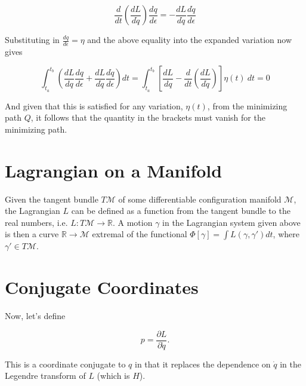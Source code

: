 \documentclass{article}\usepackage[]{graphicx}\usepackage[]{color}
\begin{document}
$$
\frac{d}{dt}\left(\frac{dL}{d\dot{q}}\right)\frac{dq}{d\epsilon}=-\frac{dL}{d\dot{q}}\frac{d\dot{q}}{d\epsilon}
$$

Substituting in $\frac{dq}{d\epsilon}=\eta$ and the above equality into the expanded variation now gives

\begin{equation}
\int^{t_b}_{t_a}\left( \frac{dL}{dq}\frac{dq}{d\epsilon}+\frac{dL}{d\dot{q}}\frac{d\dot{q}}{d\epsilon}\right) dt=\int^{t_b}_{t_a}\left[ \frac{dL}{dq} -\frac{d}{dt}\left( \frac{dL}{d\dot{q}}\right)  \right] \eta(t) \ dt=0
\end{equation}

And given that this is satisfied for any variation, $\eta(t)$, from the minimizing path $Q$, it follows that the quantity in the brackets must vanish for the minimizing path.




\section{Lagrangian on a Manifold}
Given the tangent bundle $T\mathcal{M}$ of some differentiable configuration manifold $\mathcal{M}$, the Lagrangian $L$ can be defined as a function from the tangent bundle to the real numbers, i.e. $L:T\mathcal{M}\rightarrow\mathbb{R}$. A motion $\gamma$ in the Lagrangian system given above is then a curve $\mathbb{R}\rightarrow\mathcal{M}$ extremal of the functional $\Phi[\gamma]=\int L(\gamma ,\gamma')dt$, where $\gamma'\in T\mathcal{M}$.




\pagebreak



\section{Conjugate Coordinates}

Now, let's define

\begin{equation}
p=\frac{\partial L}{\partial \dot{q}}.
\end{equation}



This is a coordinate conjugate to $q$ in that it replaces the dependence on $\dot{q}$ in the Legendre transform of $L$ (which is $H$). 
\end{document}
